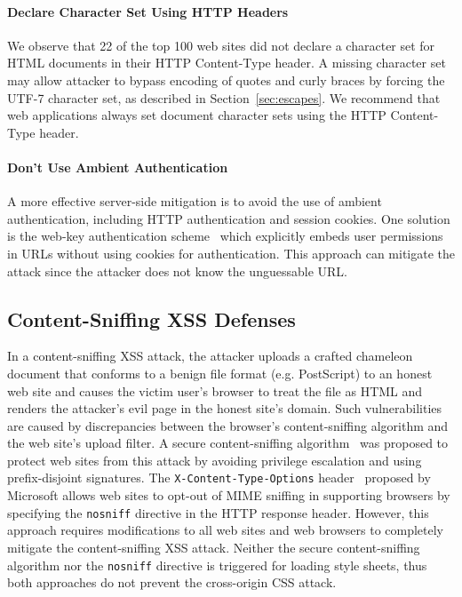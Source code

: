 \documentclass{acm_proc_article-sp}
\begin{document}
\paragraph{Declare Character Set Using HTTP Headers}

We observe that 22 of the top 100 web sites did not declare a character set
for HTML documents in their HTTP Content-Type header. A missing character set
may allow attacker to bypass encoding of quotes and curly braces by forcing
the UTF-7 character set, as described in Section~\ref{sec:escapes}. We
recommend that web applications always set document character sets using the HTTP Content-Type header.

\paragraph{Don't Use Ambient Authentication}
A more effective server-side mitigation is to avoid the use of ambient authentication, including HTTP authentication and session cookies. One solution is the web-key authentication scheme~\cite{webkey} which explicitly embeds user permissions in URLs without using cookies for authentication. This approach can mitigate the attack since the attacker does not know the unguessable URL.

\subsection{Content-Sniffing XSS Defenses}
In a content-sniffing XSS attack, the attacker uploads a crafted chameleon document that conforms to a benign file format (e.g. PostScript) to an honest web site and causes the victim user's browser to treat the file as HTML and renders the attacker's evil page in the honest site's domain. Such vulnerabilities are caused by discrepancies between the browser's content-sniffing algorithm and the web site's upload filter. A secure content-sniffing algorithm~\cite{securecontentsniffing} was proposed to protect web sites from this attack by avoiding privilege escalation and using prefix-disjoint signatures. The \texttt{X-Content-Type-Options} header~\cite{nosniff} proposed by Microsoft allows web sites to opt-out of MIME sniffing in supporting browsers by specifying the \texttt{nosniff} directive in the HTTP response header. However, this approach requires modifications to all web sites and web browsers to completely mitigate the content-sniffing XSS attack. Neither the secure content-sniffing algorithm nor the \texttt{nosniff} directive is triggered for loading style sheets, thus both approaches do not prevent the cross-origin CSS attack.
\end{document}
